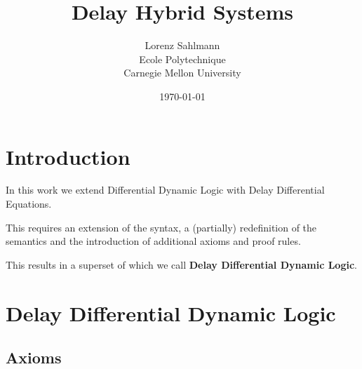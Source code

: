 \documentclass[10pt]{report}
\begin{document}
\title{Delay Hybrid Systems}

\author{Lorenz Sahlmann\\ Ecole Polytechnique\\ Carnegie Mellon University}
\date{\today}

\maketitle

\chapter{Introduction}
In this work we extend Differential Dynamic Logic with Delay Differential Equations.

This requires an extension of the syntax, a (partially) redefinition of the semantics and the introduction of additional axioms and proof rules.

This results in a superset of \dL which we call \textbf{Delay Differential Dynamic Logic}.








%
\chapter{Delay Differential Dynamic Logic}
\label{sec:delay-differential-dynamic-logic}

\section{Axioms}
    \label{sec:axioms}
\end{document}
